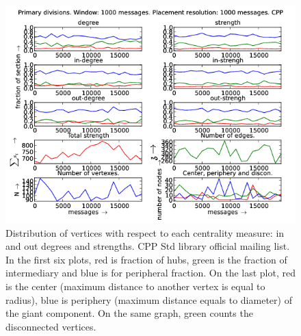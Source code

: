 \documentclass[%
 aip,
 jmp,%
 amsmath,amssymb,
 reprint,%
]{revtex4-1}
\begin{document}
\begin{figure}[hbtp] 
   \centering
        \includegraphics[width=\textwidth]{figs/CPP/1000}
    \caption{Distribution of vertices with respect to each centrality measure: in and out degrees and strengths. CPP Std library official mailing list. In the first six plots, red is fraction of hubs, green is the fraction of intermediary and blue is for peripheral fraction. On the last plot, red is the center (maximum distance to another vertex is equal to radius), blue is periphery (maximum distance equals to diameter) of the giant component. On the same graph, green counts the disconnected vertices.}
    \label{fig:cpp1000}
\end{figure}
\end{document}
